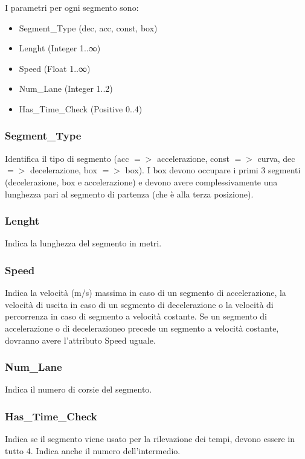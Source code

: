 \documentclass[a4paper,11pt, twoside]{book}
\begin{document}
	I parametri per ogni segmento sono:
	\begin{itemize}
	  \item Segment\_Type (dec, acc, const, box)
	  \item Lenght (Integer 1..∞)
	  \item Speed (Float 1..∞) 
	  \item Num\_Lane (Integer 1..2)
	  \item Has\_Time\_Check (Positive 0..4)
	\end{itemize}
	
	\subsubsection{Segment\_Type}
	  Identifica il tipo di segmento (acc $=>$ accelerazione, const $=>$ curva, dec $=>$ decelerazione, box $=>$ box). 
	  I box devono occupare i primi 3 segmenti (decelerazione, box e accelerazione) e devono avere complessivamente una lunghezza
	  pari al segmento di partenza (che è alla terza posizione).

	\subsubsection{Lenght}
	  Indica la lunghezza del segmento in metri.

	\subsubsection{Speed}
	  Indica la velocità (m/s) massima in caso di un segmento di accelerazione, la velocità di uscita in caso di 
	  un segmento di decelerazione o la velocità di percorrenza in caso di segmento a velocità costante.
	  Se un segmento di accelerazione o di decelerazioneo precede un segmento a velocità costante, dovranno avere l'attributo 
	  Speed uguale.

	\subsubsection{Num\_Lane}
	  Indica il numero di corsie del segmento.

	\subsubsection{Has\_Time\_Check}
	  Indica se il segmento viene usato per la rilevazione dei tempi, devono essere in tutto 4. 
	  Indica anche il numero dell'intermedio.
      
\end{document}
